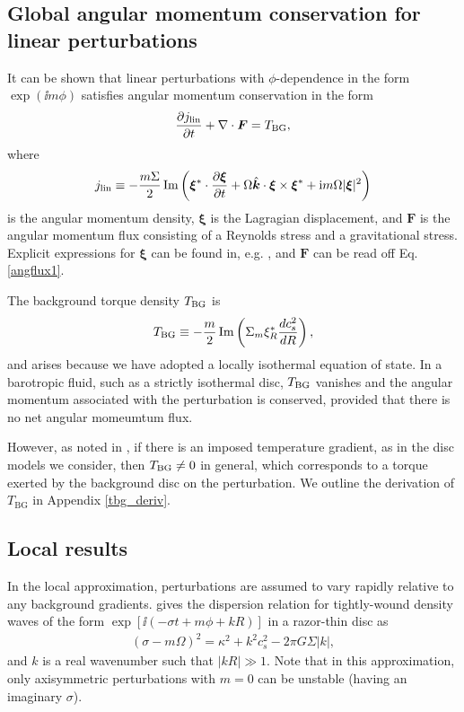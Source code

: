 \subsection{Global angular momentum conservation for linear
  perturbations} 
It can be shown that linear perturbations with $\phi$-dependence in the form
$\exp{(\ii m\phi)}$ satisfies angular momentum conservation
in the form 
\begin{align} 
  \frac{\partial j_\mathrm{lin}}{\partial t} + \nabla\cdot\bm{F} = T_\mathrm{BG}, 
\end{align}
\citep[e.g.][]{narayan87,ryu92,lin93b} where
\begin{align}\label{lin_ang_mom_cons}
  j_\mathrm{lin} \equiv
  -\frac{m\Sigma}{2}\operatorname{Im}\left(\bm{\xi}^*\cdot\frac{\partial\bm{\xi}}{\partial
      t} + \Omega \hat{\bm{k}}\cdot\bm{\xi}\times\bm{\xi}^* + \mathrm{i}
    m \Omega |\bm{\xi}|^2\right) 
\end{align}
is the angular momentum density, $\bm{\xi}$ is the Lagragian
displacement, and $\bm{F}$ is the angular momentum flux
consisting of a Reynolds stress and a gravitational stress. Explicit
expressions for $\bm{\xi}$ can be found in, e.g. \cite{papaloizou85},
and $\bm{F}$ can be read off Eq. \ref{angflux1}.  


The background torque density $T_\mathrm{BG}$ is 
\begin{align}\label{baroclinic_torque}
  T_\mathrm{BG} \equiv
  -\frac{m}{2}\operatorname{Im}\left(\Sigma_m\xi_R^*\frac{dc_s^2}{dR}\right), 
\end{align}
and arises because we have adopted a locally isothermal equation of
state. In a barotropic fluid, such as a strictly isothermal disc,
$T_\mathrm{BG}$ vanishes and the angular momentum associated with
the perturbation is conserved, provided that there is no net angular
momeumtum flux. 

However, as noted in \cite{lin11b}, if there is an imposed
temperature gradient, as in the disc models we consider,
then $T_\mathrm{BG}\neq 0$ in general, which corresponds to a torque
exerted by the background disc on the perturbation. We 
outline the derivation of $T_\mathrm{BG}$ in Appendix 
\ref{tbg_deriv}. 

\subsection{Local results}
In the local approximation, perturbations are assumed to vary rapidly
relative to any background gradients. \cite{shu91} gives the
dispersion relation for tightly-wound density 
waves of the form $\exp{[\ii(-\sigma t + m \phi + kR)]}$ in a razor-thin
disc as  
\begin{align}\label{dispersion}
  (\sigma - m\Omega)^2 = \kappa^2 + k^2c_s^2 - 2\pi G \Sigma |k|, 
\end{align}
and $k$ is a real wavenumber such that $|kR|\gg1$. Note that in this
approximation, only axisymmetric perturbations with $m=0$ can be
unstable (having an imaginary $\sigma$).  

